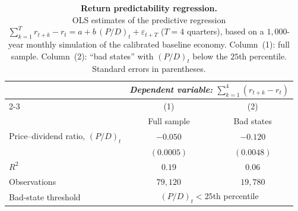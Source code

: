 \documentclass[12pt,english]{article}
\begin{document}
\begin{table}[!t]
    \centering
    \begin{tabular}{@{}lcc@{}}
        \toprule
        & \multicolumn{2}{c}{\textit{Dependent variable: }$\sum_{k=1}^{4}(r_{t+k}-r_t)$} \\
        \cmidrule(lr){2-3}
        & (1) & (2) \\
        & Full sample & Bad states \\
        \midrule
        Price--dividend ratio, $(P/D)_t$ & $-0.050$ & $-0.120$ \\
                                          & $(0.0005)$ & $(0.0048)$ \\
        \addlinespace
        $R^2$                             & $0.19$  & $0.06$  \\
        Observations                      & $79{,}120$ & $19{,}780$ \\
        \midrule
        Bad-state threshold               & \multicolumn{2}{c}{$(P/D)_t < 25$th percentile} \\
        \bottomrule
    \end{tabular}
    \vspace{2mm}
    \captionsetup{font=footnotesize}
    \caption{\textbf{Return predictability regression.}\\
    OLS estimates of the predictive regression $\sum_{k=1}^{T} r_{t+k}-r_t = a + b\,(P/D)_t + \varepsilon_{t+T}$ ($T=4$ quarters), based on a $1{,}000$-year monthly simulation of the calibrated baseline economy.
    Column~(1): full sample.
    Column~(2): ``bad states'' with $(P/D)_t$ below the $25$th percentile.
    Standard errors in parentheses.}\label{tab:return_predictability}
\end{table}
\end{document}
